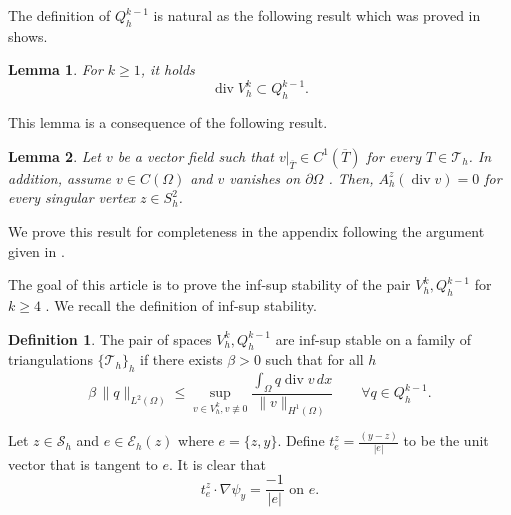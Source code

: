 \documentclass[11pt]{amsart}
\numberwithin{equation}{section}
\newcommand{\Eh}{\mathcal{E}_h}
\newcommand{\Sh}{\mathcal{S}_h}
\newcommand{\dive}{\operatorname{div}}
\newcommand{\Th}{\mathcal{T}_h}
\newtheorem{lemma}{Lemma}
\theoremstyle{definition}
\newtheorem{Def}{Definition}[section]
\begin{document}
The definition of $Q_h^{k-1}$ is natural as the following result which was proved in \cite{scott1984conforming} shows.
\begin{lemma}\label{lemma1}
For $k \ge 1$, it holds
\begin{equation*}
\dive V_h^k \subset Q_h^{k-1}.
\end{equation*}
\end{lemma}

This lemma is a consequence of the following result.  
\begin{lemma}\label{lemmasingular}
Let $v$ be a vector field such that $v|_{\overline{T}} \in C^1(\overline{T})$ for every $T \in \mathcal{T}_h$. In addition, assume $v \in C(\Omega)$ and $v$ vanishes on $\partial \Omega$  . Then, $A_h^z(\dive v)=0 $ for every singular vertex $z \in S_h^2$.  
\end{lemma}
We prove this result for completeness in the appendix
following the argument given in \cite{scott1984conforming}.


The goal of this article is to prove the inf-sup stability of the pair $V_h^k, Q_h^{k-1}$ for $ k \ge 4$ . We recall the definition of inf-sup stability.
\begin{Def}
The pair of spaces $V_h^k, Q_h^{k-1}$ are inf-sup stable on a family of triangulations 
$\{\Th\}_h$ if there exists $\beta>0 $ such that for all $h$
\begin{equation}\label{inf-sup}
\beta \, \|q\|_{L^2(\Omega)} \le \sup_{ v \in V_h^{k},  v \not\equiv 0}  \frac{\int_{\Omega} q \dive v  \, dx}{ \|v\|_{H^1(\Omega)}}  \quad \quad \forall q \in  Q_h^{k-1}. 
\end{equation}
\end{Def}


Let $z \in \Sh$ and $e \in \Eh(z)$  where $e=\{ z, y\}$.
Define $t_e^z=\frac{(y-z)}{|e|}$ to be the unit vector that is tangent to $e$.   
It is clear that  
\begin{equation}\label{tpsi}
t_e^z \cdot \nabla \psi_y= \frac{-1}{|e|}  \text{ on }  e. 
\end{equation}
\end{document}
